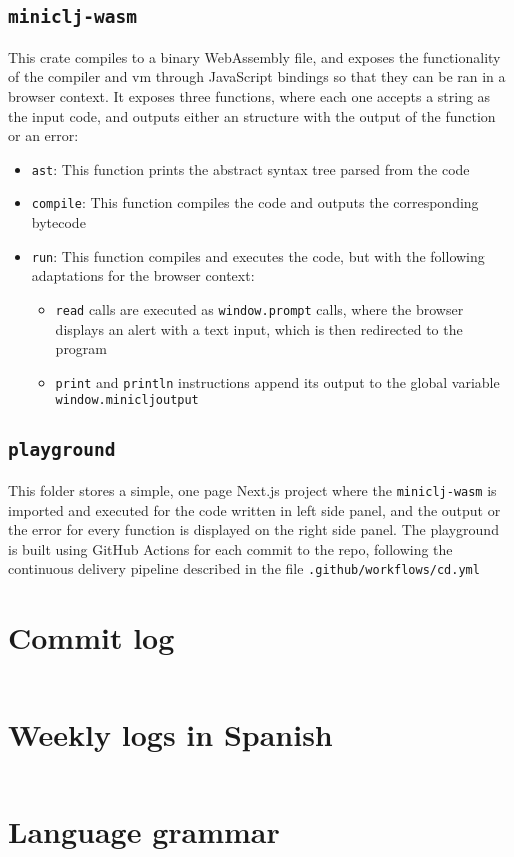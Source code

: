 \documentclass[11pt]{scrreprt}
\begin{document}
\section{\texttt{miniclj-wasm}}
This crate compiles to a binary WebAssembly file, and exposes the functionality of the compiler and vm through JavaScript bindings so that they can be ran in a browser context. It exposes three functions, where each one accepts a string as the input code, and outputs either an structure with the output of the function or an error:
\begin{itemize}
  \item \texttt{ast}: This function prints the abstract syntax tree parsed from the code
  \item \texttt{compile}: This function compiles the code and outputs the corresponding bytecode
  \item \texttt{run}: This function compiles and executes the code, but with the following adaptations for the browser context:
  \begin{itemize}
    \item \texttt{read} calls are executed as \texttt{window.prompt} calls, where the browser displays an alert with a text input, which is then redirected to the program 
    \item \texttt{print} and \texttt{println} instructions append its output to the global variable \\\texttt{window.minicljoutput}
  \end{itemize}
\end{itemize}

\section{\texttt{playground}}
This folder stores a simple, one page Next.js project where the \texttt{miniclj-wasm} is imported and executed for the code written in left side panel, and the output or the error for every function is displayed on the right side panel. The playground is built using GitHub Actions for each commit to the repo, following the continuous delivery pipeline described in the file \texttt{.github/workflows/cd.yml}


\appendix

\chapter{Commit log}
\label{apdx:commits}
\inputminted{text}{/home/mario/git/MarioJim/miniclj/docs/commits.txt}

\chapter{Weekly logs in Spanish}
\label{apdx:weeklylogs}
\inputminted[breaklines=true]{md}{/home/mario/git/MarioJim/miniclj/docs/logs.md}

\chapter{Language grammar}
\label{apdx:grammar}
\inputminted{rust}{/home/mario/git/MarioJim/miniclj/miniclj-lib/src/lispparser.lalrpop}
\end{document}
